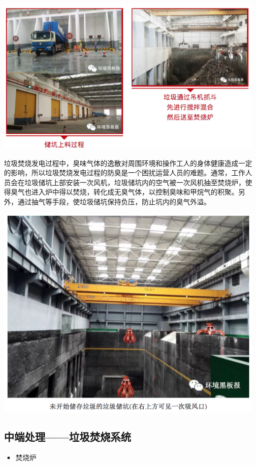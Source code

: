 \documentclass[]{book}
\providecommand{\tightlist}{%
  \setlength{\itemsep}{0pt}\setlength{\parskip}{0pt}}
\begin{document}
\includegraphics[width=8.33in]{images/ljfs2}

垃圾焚烧发电过程中，臭味气体的逸散对周围环境和操作工人的身体健康造成一定的影响，所以垃圾焚烧发电过程的防臭是一个困扰运营人员的难题。通常，工作人员会在垃圾储坑上部安装一次风机，垃圾储坑内的空气被一次风机抽至焚烧炉，使得臭气也进入炉中得以焚烧，转化成无臭气体，以控制臭味和甲烷气的积聚。另外，通过抽气等手段，使垃圾储坑保持负压，防止坑内的臭气外溢。

\includegraphics[width=8.33in]{images/ljfs3}

\subsection{中端处理------垃圾焚烧系统}

\begin{itemize}
\tightlist
\item
  焚烧炉
\end{itemize}
\end{document}
